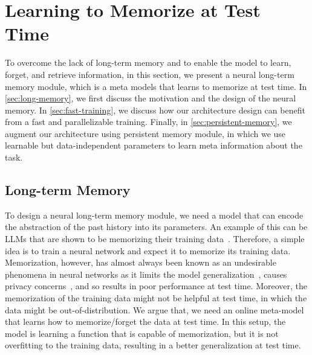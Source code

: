 \section{Learning to Memorize at Test Time}\label{sec:mem-module}
\lettrine[lines=3]{T}{}o overcome the lack of long-term memory and to enable the model to learn, forget, and retrieve information, in this section, we present a neural long-term memory module, which is a meta models that learns to memorize at test time. In \autoref{sec:long-memory}, we first discuss the motivation and the design of the neural memory.  In \autoref{sec:fast-training}, we discuss how our architecture design can benefit from a fast and parallelizable training. Finally, in \autoref{sec:persistent-memory}, we augment our architecture using persistent memory module, in which we use learnable but data-independent parameters to learn meta information about the task. 




\subsection{Long-term Memory}\label{sec:long-memory}
To design a neural long-term memory module, we need a model that can encode the abstraction of the past history into its parameters. An example of this can be LLMs that are shown to be memorizing their training data~\citep{staab2024beyond, schwarzschild2024rethinking, leybzon2024learning}. Therefore, a simple idea is to train a neural network and expect it to memorize its training data. Memorization, however, has almost always been known as an undesirable phenomena in neural networks as it limits the model generalization~\citep{bayat2024pitfalls}, causes privacy concerns~\citep{staab2024beyond}, and so results in poor performance at test time. Moreover, the memorization of the training data might not be helpful at test time, in which the data might be out-of-distribution. We argue that, we need an online meta-model that learns how to memorize/forget the data at test time. In this setup, the model is learning a function that is capable of memorization, but it is not overfitting to the training data, resulting in a better generalization at test time.    

